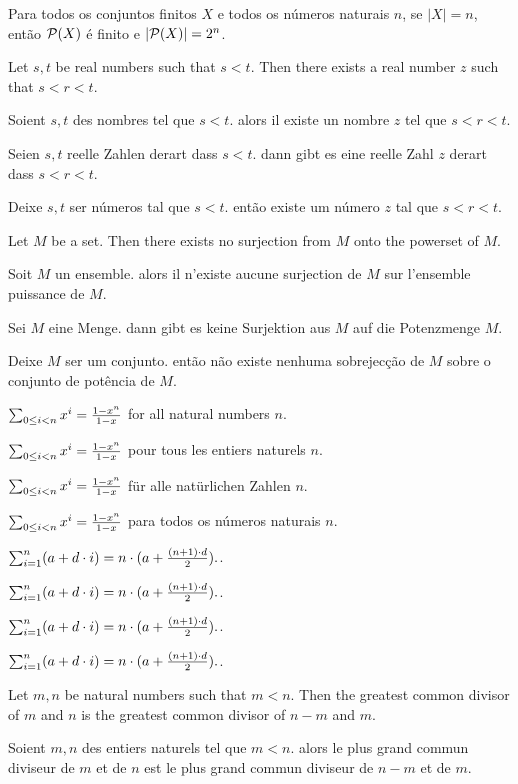 \documentclass{article}
\begin{document}
Para todos os conjuntos finitos $ X $ e todos os números naturais $ n $, se $ |X| = n $, então $ \pow(X) $ é finito e $ |\pow(X)| = 2^{n} $.


Let $ s, t $ be real numbers such that $ s < t $. Then there exists a real number $ z $ such that $ s < r < t $.

Soient $ s, t $ des nombres tel que $ s < t $. alors il existe un nombre $ z $ tel que $ s < r < t $.

Seien $ s, t $ reelle Zahlen derart dass $ s < t $. dann gibt es eine reelle Zahl $ z $ derart dass $ s < r < t $.

Deixe $ s, t $ ser números tal que $ s < t $. então existe um número $ z $ tal que $ s < r < t $.


Let $ M $ be a set. Then there exists no surjection from $ M $ onto the powerset of $ M $.

Soit $ M $ un ensemble. alors il n'existe aucune surjection de $ M $ sur l'ensemble puissance de $ M $.

Sei $ M $ eine Menge. dann gibt es keine Surjektion aus $ M $ auf die Potenzmenge $ M $.

Deixe $ M $ ser um conjunto. então não existe nenhuma sobrejecção de $ M $ sobre o conjunto de potência de $ M $.


$ \sumgeom{x}{n} = \frac{1 - x^{n}}{1 - x} $ for all natural numbers $ n $.

$ \sumgeom{x}{n} = \frac{1 - x^{n}}{1 - x} $ pour tous les entiers naturels $ n $.

$ \sumgeom{x}{n} = \frac{1 - x^{n}}{1 - x} $ für alle natürlichen Zahlen $ n $.

$ \sumgeom{x}{n} = \frac{1 - x^{n}}{1 - x} $ para todos os números naturais $ n $.


$ \sumarith{a}{d}{n} = n \cdot ( a + \frac{(n + 1) \cdot d}{2}). $.

$ \sumarith{a}{d}{n} = n \cdot ( a + \frac{(n + 1) \cdot d}{2}). $.

$ \sumarith{a}{d}{n} = n \cdot ( a + \frac{(n + 1) \cdot d}{2}). $.

$ \sumarith{a}{d}{n} = n \cdot ( a + \frac{(n + 1) \cdot d}{2}). $.


Let $ m, n $ be natural numbers such that $ m < n $. Then the greatest common divisor of $ m $ and $ n $ is the greatest common divisor of $ n-m $ and $ m $.

Soient $ m, n $ des entiers naturels tel que $ m < n $. alors le plus grand commun diviseur de $ m $ et de $ n $ est le plus grand commun diviseur de $ n-m $ et de $ m $.
\end{document}
